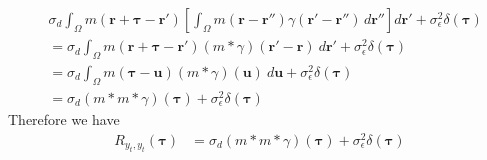 \documentclass[]{article}
\begin{document}
\begin{align}
&\sigma_d\int_{\Omega} m\left(\mathbf r  + \boldsymbol\tau - \mathbf r'\right) \left[\int_{\Omega} m\left(\mathbf r - \mathbf r''\right)\gamma(\mathbf r'-\mathbf r'') \, d\mathbf r'' \right]  d\mathbf r'+\sigma_{\epsilon}^2\delta(\boldsymbol\tau) \nonumber \\
&=\sigma_d\int_{\Omega} m\left(\mathbf r  + \boldsymbol\tau - \mathbf r'\right) \left(m\ast\gamma\right)(\mathbf r'-\mathbf r) \ d\mathbf r'+\sigma_{\epsilon}^2\delta(\boldsymbol\tau)\\
&=\sigma_d\int_{\Omega} m\left(\boldsymbol\tau - \mathbf u\right) \left(m\ast\gamma\right)(\mathbf u) \ d\mathbf u+\sigma_{\epsilon}^2\delta(\boldsymbol\tau) \nonumber \\
&=\sigma_d\left(m \ast m \ast \gamma\right)\left(\boldsymbol{\tau}\right)+\sigma_{\epsilon}^2\delta(\boldsymbol\tau)
\end{align}
Therefore we have
\begin{align}
	R_{y_{t},y_{t}}(\boldsymbol{\tau}) &= \sigma_d\left(m \ast m \ast \gamma\right)\left(\boldsymbol{\tau}\right)+\sigma_{\epsilon}^2\delta(\boldsymbol\tau)\label{eq:ObservationAutocorrelation}
\end{align}
\end{document}

